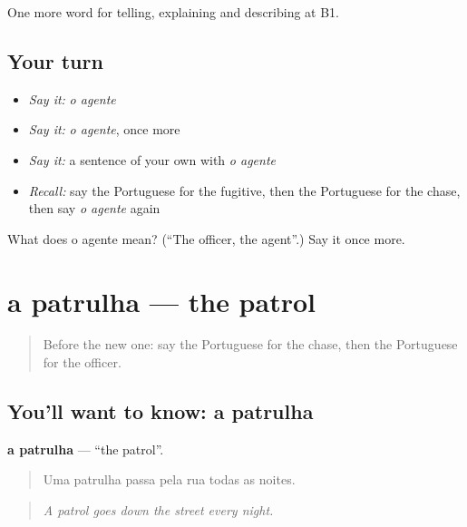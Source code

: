\begin{grammarlens}[title={What you've built}]
One more word for telling, explaining and describing at B1.
\end{grammarlens}

\subsection*{Your turn}
\begin{itemize}
\raggedright
  \item \emph{Say it:} \emph{o agente}
  \item \emph{Say it:} \emph{o agente}, once more
  \item \emph{Say it:} a sentence of your own with \emph{o agente}
  \item \emph{Recall:} say the Portuguese for the fugitive, then the Portuguese for the chase, then say \emph{o agente} again
\end{itemize}

\begin{tcolorbox}[breakable,colback=teal!4,colframe=teal!35!black,title={Before you move on}]
What does o agente mean? (\textquotedblleft{}The officer, the agent\textquotedblright{}.) Say it once more.
\end{tcolorbox}
\section[a patrulha]{a patrulha — the patrol}

\label{lesson:PT-C293-patrulha}



\begin{quote}
Before the new one: say the Portuguese for the chase, then the Portuguese for the officer.
\end{quote}

\subsection*{You'll want to know: a patrulha}
\textbf{a patrulha} — \textquotedblleft{}the patrol\textquotedblright{}.

\begin{quote}
Uma patrulha passa pela rua todas as noites.
\end{quote}

\begin{quote}
\emph{A patrol goes down the street every night.}
\end{quote}

